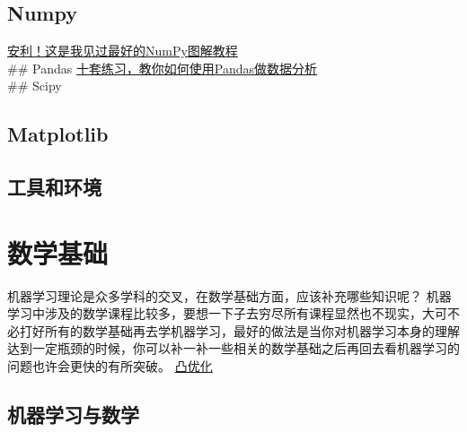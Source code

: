 \documentclass[
]{book}
\begin{document}
\hypertarget{numpy}{%
\section{Numpy}\label{numpy}}

\href{https://mp.weixin.qq.com/s?__biz=MzA4MjYwMTc5Nw==\&mid=2648931298\&idx=2\&sn=b8bc3fc9b11b9a074c676cf3c5217e84\&chksm=8794e9c8b0e360dec4a960a90871048b4a33fa827e5279967bbabab747b601c74509d2e3af4e\&token=2004915986\&lang=en_US\#rd}{安利！这是我见过最好的NumPy图解教程}\\
\#\# Pandas
\href{https://mp.weixin.qq.com/s?__biz=MzA4MjYwMTc5Nw==\&mid=2648931204\&idx=1\&sn=b3c1beeb765a2388e4df502d86393e6e\&chksm=8794e9aeb0e360b81543f36d3d94b84ca3d28b9d2ccdb0cfdaf9ad6e928cc5599303ca872488\&token=2004915986\&lang=en_US\#rd}{十套练习，教你如何使用Pandas做数据分析}\\
\#\# Scipy

\hypertarget{matplotlib}{%
\section{Matplotlib}\label{matplotlib}}

\hypertarget{ux5de5ux5177ux548cux73afux5883}{%
\section{工具和环境}\label{ux5de5ux5177ux548cux73afux5883}}

\hypertarget{ux6570ux5b66ux57faux7840}{%
\chapter{数学基础}\label{ux6570ux5b66ux57faux7840}}

机器学习理论是众多学科的交叉，在数学基础方面，应该补充哪些知识呢？
机器学习中涉及的数学课程比较多，要想一下子去穷尽所有课程显然也不现实，大可不必打好所有的数学基础再去学机器学习，最好的做法是当你对机器学习本身的理解达到一定瓶颈的时候，你可以补一补一些相关的数学基础之后再回去看机器学习的问题也许会更快的有所突破。
\href{https://mp.weixin.qq.com/s?__biz=MzA4MjYwMTc5Nw==\&mid=2648929403\&idx=1\&sn=100c16dc28c486805690e001e7d43c17\&chksm=8794e651b0e36f47d2337285cee26558b6f7d5ec11b037170d49a0fa175c1fdc384649130fa0\&token=2004915986\&lang=en_US\#rd}{凸优化}

\hypertarget{ux673aux5668ux5b66ux4e60ux4e0eux6570ux5b66}{%
\section{机器学习与数学}\label{ux673aux5668ux5b66ux4e60ux4e0eux6570ux5b66}}
\end{document}
